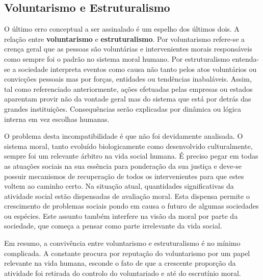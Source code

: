 \documentclass[a4paper,onecolumn,11pt]{article}
\begin{document}
		\subsection{Voluntarismo e Estruturalismo}
		
		O último erro conceptual a ser assinalado é um espelho dos últimos dois. A relação entre \textbf{voluntarismo} e \textbf{estruturalismo}. Por voluntarismo refere-se a crença geral que as pessoas são voluntárias e intervenientes morais responsáveis como sempre foi o padrão no sistema moral humano. Por estruturalismo entenda-se a sociedade interpreta eventos como causa não tanto pelos atos voluntários ou convicções pessoais mas por forças, entidades ou tendências inabaláveis. Assim, tal como referenciado anteriormente, ações efetuadas pelas empresas ou estados aparentam provir não da vontade geral mas do sistema que está por detrás das grandes instituições. Consequências serão explicadas por dinâmica ou lógica interna em vez escolhas humanas.
		
		O problema desta incompatibilidade é que não foi devidamente analisada. O sistema moral, tanto evoluído biologicamente como desenvolvido culturalmente, sempre foi um relevante árbitro na vida social humana. É preciso pegar em todas as atuações sociais na sua essência para ponderação da sua justiça e deve-se possuir mecanismos de recuperação de todos os intervenientes para que estes voltem ao caminho certo. Na situação atual, quantidades significativas da atividade social estão dispensadas de avaliação moral. Esta dispensa permite o crescimento de problemas sociais pondo em causa o futuro de algumas sociedades ou espécies. Este assunto também interfere na visão da moral por parte da sociedade, que começa a pensar como parte irrelevante da vida social.
		
		Em resumo, a convivência entre voluntarismo e estruturalismo é no mínimo complicada. A constante procura por reputação do voluntarismo por um papel relevante na vida humana, esconde o fato de que a crescente proporção da atividade foi retirada do controlo do voluntariado e até do escrutínio moral.
		
		
		


\end{document}
